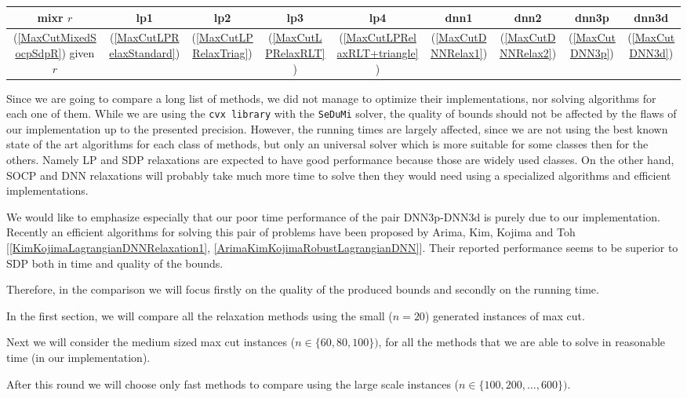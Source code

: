 \documentclass[12pt]{book}
\theoremstyle{definition}
\begin{document}
\begin{tabular}{|c|c|c|c|c|c|c|c|c|}
\hline
mixr $r$ &
lp1 &
lp2 &
lp3 &
lp4 &
dnn1 &
dnn2 &
dnn3p &
dnn3d 	
\\ \hline
(\ref{MaxCutMixedSocpSdpR}) given $r$ &
(\ref{MaxCutLPRelaxStandard}) &
(\ref{MaxCutLPRelaxTriag}) &
(\ref{MaxCutLPRelaxRLT}) &
(\ref{MaxCutLPRelaxRLT+triangle}) &
(\ref{MaxCutDNNRelax1}) &
(\ref{MaxCutDNNRelax2}) &
(\ref{MaxCutDNN3p}) &
(\ref{MaxCutDNN3d}) \\
\hline
\end{tabular}

\bigskip


Since we are going to compare a long list of methods, we did not manage to optimize their implementations, nor solving algorithms for each one of them. While we are using the {\tt cvx library} with the {\tt SeDuMi} solver, the quality of bounds should not be affected by the flaws of our implementation up to the presented precision. However, the running times are largely affected, since we are not using the best known state of the art algorithms for each class of methods, but only an universal solver which is more suitable for some classes then for the others. Namely LP and SDP relaxations are expected to have good performance because those are widely used classes. On the other hand, SOCP and DNN relaxations will probably take much more time to solve then they would need using a specialized algorithms and efficient implementations.

\rem We would like to emphasize especially that our poor time performance of the pair DNN3p-DNN3d is purely due to our implementation. Recently an efficient algorithms for solving this pair of problems have been proposed by Arima, Kim, Kojima and Toh [\ref{KimKojimaLagrangianDNNRelaxation1}, \ref{ArimaKimKojimaRobustLagrangianDNN}]. Their reported performance seems to be superior to SDP both in time and quality of the bounds.

Therefore, in the comparison we will focus firstly on the quality of the produced bounds and secondly on the running time.

In the first section, we will compare all the relaxation methods using the small ($n=20$) generated instances of max cut. 

Next we will consider the medium sized max cut instances ($n\in\{60, 80, 100\})$, for all the methods that we are able to solve in reasonable time  (in our implementation).

After this round we will choose only fast methods to compare using the large scale instances ($n\in\{100,200,\dots, 600\})$. 
\end{document}

